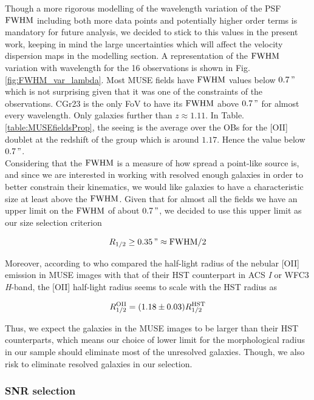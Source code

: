 Though a more rigorous modelling of the wavelength variation of the PSF $\rm{FWHM}$ including both more data points and potentially higher order terms is mandatory for future analysis, we decided to stick to this values in the present work, keeping in mind the large uncertainties which will affect the velocity dispersion maps in the modelling section. A representation of the $\rm{FWHM}$ variation with wavelength for the 16 observations is shown in Fig.\,\ref{fig:FWHM_var_lambda}. Most MUSE fields have $\rm{FWHM}$ values below $\SI{0.7}{"}$ which is not surprising given that it was one of the constraints of the observations. CGr23 is the only FoV to have its $\rm{FWHM}$ above $\SI{0.7}{"}$ for almost every wavelength. Only galaxies further than $z \approx 1.11$. In Table.\,\ref{table:MUSEfieldsProp}, the seeing is the average over the OBs for the [OII] doublet at the redshift of the group which is around $1.17$. Hence the value below $\SI{0.7}{"}$. \\

Considering that the $\rm{FWHM}$ is a measure of how spread a point-like source is, and since we are interested in working with resolved enough galaxies in order to better constrain their kinematics, we would like galaxies to have a characteristic size at least above the $\rm{FWHM}$. Given that for almost all the fields we have an upper limit on the $\rm{FWHM}$ of about $\SI{0.7}{"}$, we decided to use this upper limit as our size selection criterion

\begin{equation}
	R_{1/2} \geq \SI{0.35}{"} \approx \rm{FWHM}/2
\end{equation}

Moreover, according to  who compared the half-light radius of the nebular [OII] emission in MUSE images with that of their HST counterpart in ACS \textit{I} or WFC3 \textit{H}-band, the [OII] half-light radius seems to scale with the HST radius as 

\begin{equation}
	R_{1/2}^{\rm{OII}} = (1.18 \pm 0.03) R_{1/2}^{\rm{HST}}
\end{equation}

Thus, we expect the galaxies in the MUSE images to be larger than their HST counterparts, which means our choice of lower limit for the morphological radius in our sample should eliminate most of the unresolved galaxies. Though, we also risk to eliminate resolved galaxies in our selection.

\subsubsection{SNR selection}
\label{sec:cut_SNR}

